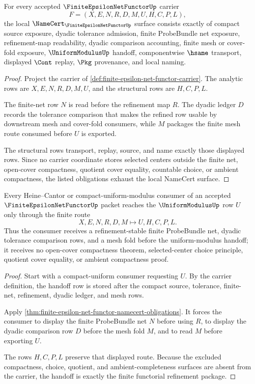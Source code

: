 \begin{theorem}
\label{thm:finite-epsilon-net-functor-namecert-obligations}
For every accepted $\FiniteEpsilonNetFunctorUp$ carrier
$$
F=(X,E,N,R,D,M,U,H,C,P,L),
$$
the local $\NameCert_{\FiniteEpsilonNetFunctorUp}$ surface consists exactly of compact source exposure, dyadic tolerance admission, finite ProbeBundle net exposure, refinement-map readability, dyadic comparison accounting, finite mesh or cover-fold exposure, $\UniformModulusUp$ handoff, componentwise $\hsame$ transport, displayed $\Cont$ replay, $\Pkg$ provenance, and local naming.
\end{theorem}
\begin{proof}
Project the carrier of \autoref{def:finite-epsilon-net-functor-carrier}. The analytic rows are $X,E,N,R,D,M,U$, and the structural rows are $H,C,P,L$.

The finite-net row $N$ is read before the refinement map $R$. The dyadic ledger $D$ records the tolerance comparison that makes the refined row usable by downstream mesh and cover-fold consumers, while $M$ packages the finite mesh route consumed before $U$ is exported.

The structural rows transport, replay, source, and name exactly those displayed rows. Since no carrier coordinate stores selected centers outside the finite net, open-cover compactness, quotient cover equality, countable choice, or ambient compactness, the listed obligations exhaust the local NameCert surface.
\end{proof}

\begin{theorem}
\label{thm:finite-epsilon-net-functor-uniform-modulus-handoff}
Every Heine--Cantor or compact-uniform-modulus consumer of an accepted $\FiniteEpsilonNetFunctorUp$ packet reaches the $\UniformModulusUp$ row $U$ only through the finite route
$$
X,E,N,R,D,M \longmapsto U,H,C,P,L .
$$
Thus the consumer receives a refinement-stable finite ProbeBundle net, dyadic tolerance comparison rows, and a mesh fold before the uniform-modulus handoff; it receives no open-cover compactness theorem, selected-center choice principle, quotient cover equality, or ambient compactness proof.
\end{theorem}
\begin{proof}
Start with a compact-uniform consumer requesting $U$. By the carrier definition, the handoff row is stored after the compact source, tolerance, finite-net, refinement, dyadic ledger, and mesh rows.

Apply \autoref{thm:finite-epsilon-net-functor-namecert-obligations}. It forces the consumer to display the finite ProbeBundle net $N$ before using $R$, to display the dyadic comparison row $D$ before the mesh fold $M$, and to read $M$ before exporting $U$.

The rows $H,C,P,L$ preserve that displayed route. Because the excluded compactness, choice, quotient, and ambient-completeness surfaces are absent from the carrier, the handoff is exactly the finite functorial refinement package.
\end{proof}

